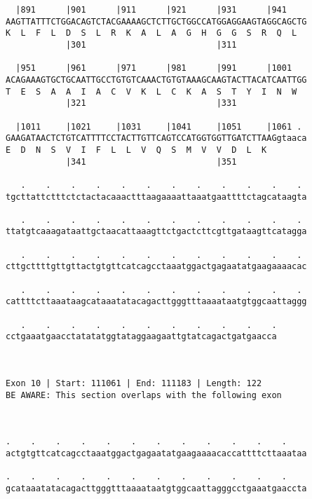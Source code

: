\documentclass{article}
\begin{document}
\begin{Verbatim}
  |891      |901      |911      |921      |931      |941    
AAGTTATTTCTGGACAGTCTACGAAAAGCTCTTGCTGGCCATGGAGGAAGTAGGCAGCTG
K  L  F  L  D  S  L  R  K  A  L  A  G  H  G  G  S  R  Q  L  
            |301                          |311              
  
  |951      |961      |971      |981      |991      |1001   
ACAGAAAGTGCTGCAATTGCCTGTGTCAAACTGTGTAAAGCAAGTACTTACATCAATTGG
T  E  S  A  A  I  A  C  V  K  L  C  K  A  S  T  Y  I  N  W  
            |321                          |331              
  
  |1011     |1021     |1031     |1041     |1051     |1061 . 
GAAGATAACTCTGTCATTTTCCTACTTGTTCAGTCCATGGTGGTTGATCTTAAGgtaaca
E  D  N  S  V  I  F  L  L  V  Q  S  M  V  V  D  L  K        
            |341                          |351              
  
   .    .    .    .    .    .    .    .    .    .    .    . 
tgcttattctttctctactacaaactttaagaaaattaaatgaattttctagcataagta
                                                            
   .    .    .    .    .    .    .    .    .    .    .    . 
ttatgtcaaagataattgctaacattaaagttctgactcttcgttgataagttcatagga
                                                            
   .    .    .    .    .    .    .    .    .    .    .    . 
cttgcttttgttgttactgtgttcatcagcctaaatggactgagaatatgaagaaaacac
                                                            
   .    .    .    .    .    .    .    .    .    .    .    . 
cattttcttaaataagcataaatatacagacttgggtttaaaataatgtggcaattaggg
                                                            
   .    .    .    .    .    .    .    .    .    .    .
cctgaaatgaacctatatatggtataggaagaattgtatcagactgatgaacca
                                                      
                                                      
 
Exon 10 | Start: 111061 | End: 111183 | Length: 122
BE AWARE: This section overlaps with the following exon



.    .    .    .    .    .    .    .    .    .    .    .    
actgtgttcatcagcctaaatggactgagaatatgaagaaaacaccattttcttaaataa
                                                            
.    .    .    .    .    .    .    .    .    .    .    .    
gcataaatatacagacttgggtttaaaataatgtggcaattagggcctgaaatgaaccta
                                                            

\end{Verbatim}
\end{document}
